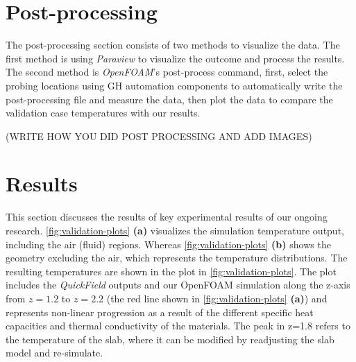 \section{Post-processing}
The post-processing section consists of two methods to visualize the data. The first method is using \textit{Paraview} to visualize the outcome and process the results. The second method is \textit{OpenFOAM}'s post-process command, first, select the probing locations using GH automation components to automatically write the post-processing file and measure the data, then plot the data to compare the validation case temperatures with our results. 

(WRITE HOW YOU DID POST PROCESSING AND ADD IMAGES)


\section{Results}
This section discusses the results of key experimental results of our ongoing research. 
\cref{fig:validation-plots} \textbf{(a)} visualizes the simulation temperature output, including the air (fluid) regions. Whereas
\cref{fig:validation-plots} \textbf{(b)} shows the geometry excluding the air, which represents the temperature distributions. The resulting temperatures are shown in the plot in \cref{fig:validation-plots}. The plot includes the \textit{QuickField} outputs and our OpenFOAM simulation along the z-axis from $z= 1.2$ to $z=2.2$ (the red line shown in \cref{fig:validation-plots} \textbf{(a)}) and represents non-linear progression as a result of the different specific heat capacities and thermal conductivity of the materials. The peak in z=1.8 refers to the temperature of the slab, where it can be modified by readjusting the slab model and re-simulate. 



